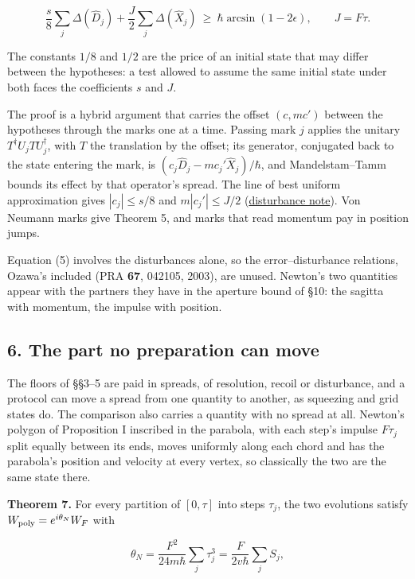 \documentclass[11pt,a4paper]{article}
\begin{document}
\[\frac s8\sum_j\Delta(\hat D_j)+\frac J2\sum_j\Delta(\hat X_j)\ \ge\ \hbar\arcsin(1-2\epsilon),\qquad J=F\tau. \tag{5}\]

The constants \(1/8\) and \(1/2\) are the price of an initial state that
may differ between the hypotheses: a test allowed to assume the same
initial state under both faces the coefficients \(s\) and \(J\).

The proof is a hybrid argument that carries the offset \((c,mc')\)
between the hypotheses through the marks one at a time. Passing mark
\(j\) applies the unitary \(T^\dagger U_jTU_j^\dagger\), with \(T\) the
translation by the offset; its generator, conjugated back to the state
entering the mark, is \((c_j\hat D_j-mc_j'\hat X_j)/\hbar\), and
Mandelstam--Tamm bounds its effect by that operator's spread. The line
of best uniform approximation gives \(|c_j|\le s/8\) and
\(m|c_j'|\le J/2\)
(\href{record-distance-path-length.md\#general-disturbance-theorem-with-an-unknown-preparation}{disturbance
note}). Von Neumann marks give Theorem 5, and marks that read momentum
pay in position jumps.

Equation (5) involves the disturbances alone, so the error--disturbance
relations, Ozawa's included (PRA \textbf{67}, 042105, 2003), are unused.
Newton's two quantities appear with the partners they have in the
aperture bound of §10: the sagitta with momentum, the impulse with
position.

\hypertarget{the-part-no-preparation-can-move}{%
\subsection{6. The part no preparation can
move}\label{the-part-no-preparation-can-move}}

The floors of §§3--5 are paid in spreads, of resolution, recoil or
disturbance, and a protocol can move a spread from one quantity to
another, as squeezing and grid states do. The comparison also carries a
quantity with no spread at all. Newton's polygon of Proposition I
inscribed in the parabola, with each step's impulse \(F\tau_j\) split
equally between its ends, moves uniformly along each chord and has the
parabola's position and velocity at every vertex, so classically the two
are the same state there.

\textbf{Theorem 7.} For every partition of \([0,\tau]\) into steps
\(\tau_j\), the two evolutions satisfy \(W_{\rm poly}=e^{i\theta_N}W_F\)
with

\[\theta_N=\frac{F^2}{24m\hbar}\sum_j\tau_j^3=\frac{F}{2v\hbar}\sum_jS_j,\]
\end{document}
